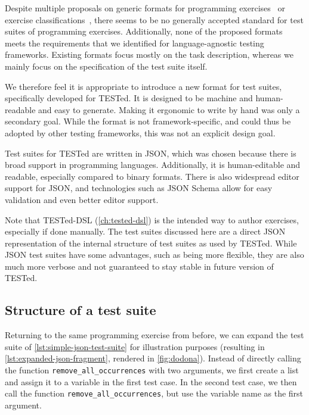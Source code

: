 \documentclass[../main]{subfiles}
\begin{document}
Despite multiple proposals on generic formats for programming exercises~\autocite{edwardsDevelopingCommonFormat2008a,paivaAnotherProgrammingExercises2020,queirosPexilProgrammingExercises2011,verhoeffProgrammingTaskPackages2008} or exercise classifications~\autocite{leOperationalizingContinuumWelldefined2013,simoesNatureProgrammingExercises2020}, there seems to be no generally accepted standard for test suites of programming exercises.
Additionally, none of the proposed formats meets the requirements that we identified for language-agnostic testing frameworks.
Existing formats focus mostly on the task description, whereas we mainly focus on the specification of the test suite itself.

We therefore feel it is appropriate to introduce a new format for test suites, specifically developed for TESTed.
It is designed to be machine and human-readable and easy to generate.
Making it ergonomic to write by hand was only a secondary goal.
While the format is not framework-specific, and could thus be adopted by other testing frameworks, this was not an explicit design goal.

Test suites for TESTed are written in JSON, which was chosen because there is broad support in programming languages.
Additionally, it is human-editable and readable, especially compared to binary formats.
There is also widespread editor support for JSON, and technologies such as JSON Schema allow for easy validation and even better editor support.

Note that TESTed-DSL (\cref{ch:tested-dsl}) is the intended way to author exercises, especially if done manually.
The test suites discussed here are a direct JSON representation of the internal structure of test suites as used by TESTed.
While JSON test suites have some advantages, such as being more flexible, they are also much more verbose and not guaranteed to stay stable in future version of TESTed.

\subsection{Structure of a test suite}\label{subsec:structure-of-a-test-suite}

Returning to the same programming exercise from before, we can expand the test suite of \cref{lst:simple-json-test-suite} for illustration purposes (resulting in \cref{lst:expanded-json-fragment}, rendered in \cref{fig:dodona}).
Instead of directly calling the function \texttt{remove_all_occurrences} with two arguments, we first create a list and assign it to a variable in the first test case.
In the second test case, we then call the function \texttt{remove_all_occurrences}, but use the variable name as the first argument.
\end{document}
